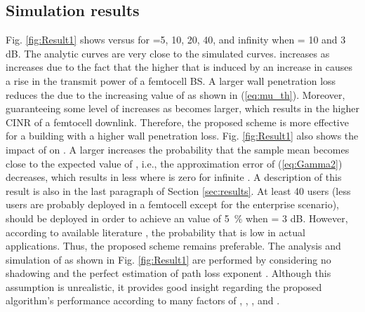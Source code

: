 \documentclass[draftclsnofoot,12pt,onecolumn]{IEEEtran}
\begin{document}
\subsection{Simulation results}
Fig. \ref{fig:Result1} shows  versus  for
=5, 10, 20, 40, and infinity when  = 10 and 3 dB. The
analytic curves are very close to the simulated curves. 
increases as  increases due to the fact that the
higher  that is induced by an increase in
 causes a rise in the transmit power of a femtocell
BS. A larger wall penetration loss  reduces the  due to
the increasing value of  as shown in
(\ref{eq:mu_th}). Moreover,  guaranteeing some
level of  increases as  becomes larger, which results in
the higher CINR of a femtocell downlink. Therefore, the proposed
scheme is more effective for a building with a higher wall
penetration loss. Fig. \ref{fig:Result1} also shows the impact of
 on . A larger  increases the probability that the sample
mean  becomes close to the expected value of ,
i.e., the approximation error of (\ref{eq:Gamma2}) decreases, which
results in less  where  is zero for infinite . A
description of this result is also in the last paragraph of Section
\ref{sec:results}. At least 40 users (less users are probably
deployed in a femtocell except for the enterprise scenario), should
be deployed in order to achieve an  value of 5~\% when  =
3 dB. However, according to available literature
\cite{WallLoss1}\cite{WallLoss3}, the probability that  is
low in actual applications. Thus, the proposed scheme remains
preferable. The analysis and simulation of  as shown in Fig.
\ref{fig:Result1} are performed by considering no shadowing and the
perfect estimation of path loss exponent . Although this
assumption is unrealistic, it provides good insight regarding the
proposed algorithm's performance according to many factors of
, , , and .
\end{document}
